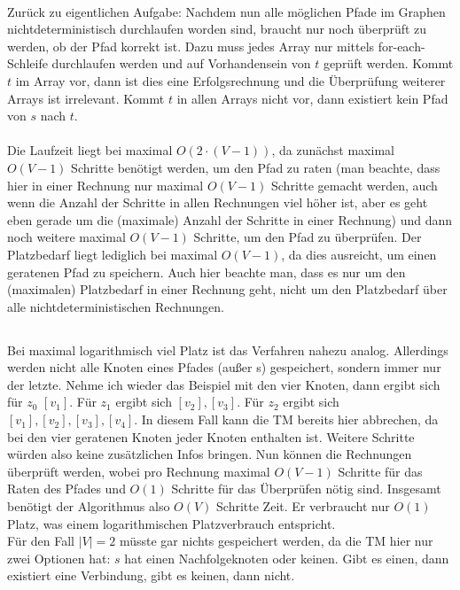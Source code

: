 \documentclass[10pt,a4paper,oneside,ngerman,numbers=noenddot]{scrartcl}
\begin{document}
\\
Zurück zu eigentlichen Aufgabe: Nachdem nun alle möglichen Pfade im Graphen nichtdeterministisch durchlaufen worden sind, braucht nur noch überprüft zu werden, ob der Pfad korrekt ist. Dazu muss jedes Array nur mittels for-each-Schleife durchlaufen werden und auf Vorhandensein von $t$ geprüft werden. Kommt $t$ im Array vor, dann ist dies eine Erfolgsrechnung und die Überprüfung weiterer Arrays ist irrelevant. Kommt $t$ in allen Arrays nicht vor, dann existiert kein Pfad von $s$ nach $t$.\\
\\
Die Laufzeit liegt bei maximal $O(2 \cdot (V-1))$, da zunächst maximal $O(V-1)$ Schritte benötigt werden, um den Pfad zu raten (man beachte, dass hier in einer Rechnung nur maximal $O(V-1)$ Schritte gemacht werden, auch wenn die Anzahl der Schritte in allen Rechnungen viel höher ist, aber es geht eben gerade um die (maximale) Anzahl der Schritte in einer Rechnung) und dann noch weitere maximal $O(V-1)$ Schritte, um den Pfad zu überprüfen. Der Platzbedarf liegt lediglich bei maximal $O(V-1)$, da dies ausreicht, um einen geratenen Pfad zu speichern. Auch hier beachte man, dass es nur um den (maximalen) Platzbedarf in einer Rechnung geht, nicht um den Platzbedarf über alle nichtdeterministischen Rechnungen.
\subsection{} %
Bei maximal logarithmisch viel Platz ist das Verfahren nahezu analog. Allerdings werden nicht alle Knoten eines Pfades (außer s) gespeichert, sondern immer nur der letzte.
Nehme ich wieder das Beispiel mit den vier Knoten, dann ergibt sich für $z_{0}$ $[v_{1}]$. Für $z_{1}$ ergibt sich $[v_{2}],[v_{3}]$. Für $z_{2}$ ergibt sich $[v_{1}],[v_{2}],[v_{3}],[v_{4}]$. In diesem Fall kann die TM bereits hier abbrechen, da bei den vier geratenen Knoten jeder Knoten enthalten ist. Weitere Schritte würden also keine zusätzlichen Infos bringen. Nun können die Rechnungen überprüft werden, wobei pro Rechnung maximal $O(V-1)$ Schritte für das Raten des Pfades und $O(1)$ Schritte für das Überprüfen nötig sind. Insgesamt benötigt der Algorithmus also $O(V)$ Schritte Zeit. Er verbraucht nur $O(1)$ Platz, was einem logarithmischen Platzverbrauch entspricht.\\
Für den Fall $|V|=2$ müsste gar nichts gespeichert werden, da die TM hier nur zwei Optionen hat: $s$ hat einen Nachfolgeknoten oder keinen. Gibt es einen, dann existiert eine Verbindung, gibt es keinen, dann nicht.
\end{document}

